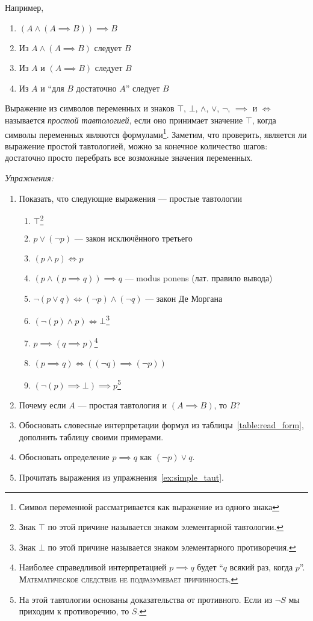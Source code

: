 Например,
\begin{enumerate}
	\item{}$(A\land (A\implies B))\implies B$
	\item{}Из $A\land (A\implies B)$ следует $B$
	\item{}Из $A$ и $(A\implies B)$ следует $B$
	\item{}Из $A$ и ``для $B$ достаточно $A$'' следует $B$
\end{enumerate}

Выражение из символов переменных и знаков $\top$, $\bot$, $\land$, $\lor$, $\lnot$,
$\implies$ и $\iff$ называется {\it простой тавтологией}, если
оно принимает значение $\top$, когда символы переменных являются формулами\footnote{
	Символ переменной рассматривается как выражение из одного знака
}.
Заметим, что проверить, является ли выражение простой тавтологией,
можно за конечное количество шагов: достаточно просто перебрать все возможные значения
переменных.

\vspace{1em}
{\it Упражнения:}

\begin{enumerate}
	\item{}Показать, что следующие выражения --- простые тавтологии\label{ex:simple_taut}
	\begin{enumerate}
		\item{}$\top$\footnote{Знак $\top$ по этой причине называется
			знаком элементарной тавтологии.}
		\item{}$p\lor (\lnot p)$ --- закон исключённого третьего
		\item{}$(p\land p)\iff p$
		\item{}$(p\land (p\implies q))\implies q$ --- modus ponens (лат. правило вывода)
		\item{}$\lnot(p\lor q)\iff (\lnot p)\land (\lnot q)$ --- закон Де Моргана
		\item{}$(\lnot(p)\land p)\iff\bot$\footnote{
			Знак $\bot$ по этой причине называется
			знаком элементарного противоречия.}
		\item{}$p\implies (q\implies p)$\footnote{
			Наиболее справедливой интерпретацией ${p\implies q}$ будет
			``$q$ всякий раз, когда $p$''.
			\textsc{Математическое следствие не подразумевает причинность.}
		}
		\item{}${(p\implies q)\iff ((\lnot q)\implies (\lnot p))}$
		\item{}$(\lnot(p)\implies\bot)\implies p$\footnote[][1mm]{
			На этой тавтологии основаны
			доказательства от противного. Если из $\lnot S$ мы приходим
			к противоречию, то $S$.}
	\end{enumerate}
	\item{}Почему если $A$ --- простая тавтология и $(A\implies B)$, то $B$?
	\item{}Обосновать словесные интерпретации формул из таблицы~\ref{table:read_form},
	дополнить таблицу своими примерами.
	\item{}Обосновать определение $p\implies q$ как $(\lnot p)\lor q$.
	\item{}Прочитать выражения из упражнения~\ref{ex:simple_taut}.
\end{enumerate}


